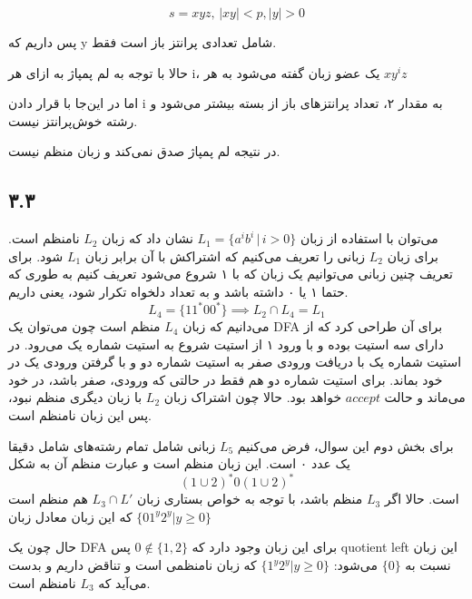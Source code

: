 $$s = xyz,\,|x y| < p, |y| > 0$$

پس داریم که y شامل تعدادی پرانتز باز است فقط.

حالا با توجه به لم پمپاژ به ازای هر i، یک عضو زبان گفته می‌شود به هر 
$x y^i z$

اما در این‌جا با قرار دادن i به مقدار ۲، تعداد پرانتزهای باز از بسته بیشتر می‌شود و رشته خوش‌پرانتز نیست. 

در نتیجه لم پمپاژ صدق نمی‌کند و زبان منظم نیست.

\subsection*{۳.۳}

می‌توان با استفاده از زبان
$L_1 = \{a^i b^i\,|\,i > 0\}$
نشان داد که زبان
$L_2$
نامنظم است. برای زبان
$L_2$
زبانی را تعریف می‌کنیم که اشتراکش با آن برابر زبان
$L_1$
شود. برای تعریف چنین زبانی می‌توانیم یک زبان که با ۱ شروع می‌شود تعریف کنیم به طوری که حتما ۱ یا ۰ داشته باشد و به تعداد دلخواه تکرار شود، یعنی داریم.
$$L_4 = \{11^{*} 00^{*}\} \implies L_2 \cap L_4 = L_1$$
می‌دانیم که زبان
$L_4$
منظم است چون می‌توان یک
DFA
برای آن طراحی کرد که از دارای سه استیت بوده و با ورود ۱ از استیت شروع به استیت شماره یک می‌رود. در استیت شماره یک با دریافت ورودی صفر به استیت شماره دو و با گرفتن ورودی یک در خود بماند. برای استیت شماره دو هم فقط در حالتی که ورودی، صفر باشد، در خود می‌ماند و حالت
$accept$
خواهد بود.
حالا چون اشتراک زبان
$L_2$
با زبان دیگری منظم نبود، پس این زبان نامنظم است.

برای بخش دوم این سوال، فرض می‌کنیم 
$L_5$
زبانی شامل تمام رشته‌های شامل دقیقا یک عدد ۰ است. این زبان منظم است و عبارت منظم آن به شکل 
$$
(1 \cup 2)^* 0(1 \cup 2)^*
$$
است.
حالا اگر 
$L_3$
منظم باشد، با توجه به خواص بستاری زبان 
$L_3 \cap L'$
هم منظم است که این زبان معادل زبان
$\{ 01^y2^y | y \geq 0 \}$

حال چون یک DFA برای این زبان وجود دارد که 
$0 \notin \{ 1, 2\}$
پس 	
quotient left
این زبان نسبت به 
$\{ 0 \}$
می‌شود:
$\{ 1^y2^y | y \geq 0 \}$
که زبان نامنظمی است و تناقض داریم و بدست می‌آید که 
$L_3$
نامنظم است.